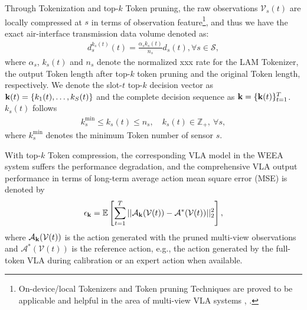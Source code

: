 \documentclass[lettersize,journal]{IEEEtran}
\theoremstyle{custom}
\begin{document}
Through Tokenization and top-$k$ Token pruning, the raw observations $\mathcal{V}_s(t)$ are locally compressed at $s$ in terms of observation feature\footnote{On-device/local Tokenizers and Token pruning Techniques are proved to be applicable and helpful in the area of multi-view VLA systems \cite{}, \cite{}. }, and thus we have the exact air-interface transmission data volume denoted as: 
\begin{align}
    d_s^{k_s(t)}(t) = \frac{\alpha_s k_s(t)}{n_s} d_s(t), \forall s \in \mathcal{S}, 
\end{align}
where $\alpha_s$, $k_s(t)$ and $n_s$ denote the normalized xxx rate for the LAM Tokenizer, the output Token length after top-$k$ token pruning and the original Token length, respectively. We denote the slot-$t$ top-$k$ decision vector as ${\bf k}(t)=\{k_1(t),\ldots,k_S(t)\}$ and the complete decision sequence as ${\bf k}=\{{\bf k}(t)\}_{t=1}^{T}$. $k_s(t)$ follows
\begin{align}\label{token_cons}
    k_s^{\min}\leq k_s(t)\leq n_s,\quad k_s(t)\in\mathbb Z_+, \ \forall s,
\end{align}
where $k_s^{\min}$ denotes the minimum Token number of sensor $s$. 

With top-$k$ Token compression, the corresponding VLA model in the WEEA system suffers the performance degradation, and the comprehensive VLA output performance in terms of long-term average action mean square error (MSE) \cite{} is denoted by 
\begin{align}
    \epsilon_{\bf k} = \mathbb{E} \left[\sum_{t = 1}^T\vert\vert \mathcal{A}_{\bf k}(\mathcal{V}(t)) - \mathcal{A}^*(\mathcal{V}(t)) \vert\vert^2_2\right], 
\end{align}
where $\mathcal{A}_{\bf k}(\mathcal{V}(t))$ is the action generated with the pruned multi-view observations and $\mathcal{A}^*(\mathcal{V}(t))$ is the reference action, e.g., the action generated by the full-token VLA during calibration or an expert action when available. 

\end{document}
